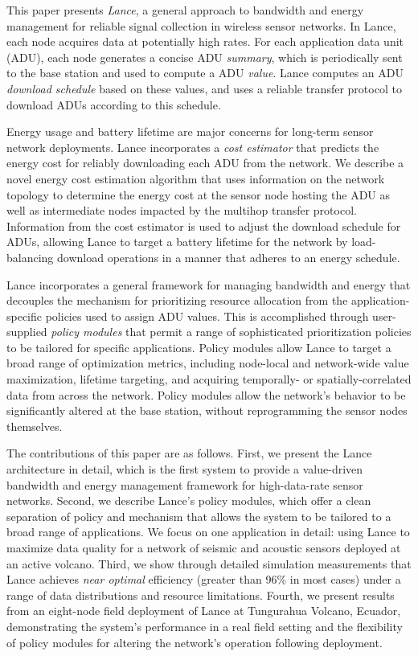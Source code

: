 \documentclass[lettersize]{sig-alternate-konrad}
\begin{document}
This paper presents {\em Lance}, a general approach to bandwidth and energy
management for reliable signal collection in wireless sensor networks. In
Lance, each node acquires data at potentially high rates. For each
application data unit (ADU), each node generates a concise ADU {\em summary},
which is periodically sent to the base station and used to compute a ADU {\em
value}.  Lance computes an ADU {\em download schedule} based on these values,
and uses a reliable transfer protocol to download ADUs according to this
schedule.

Energy usage and battery lifetime are major concerns for long-term
sensor network deployments. 
Lance incorporates a {\em cost estimator} that
predicts the energy cost for reliably
downloading each ADU from the network. We describe a novel energy cost
estimation algorithm that uses information on the network topology to 
determine the energy cost at the sensor node hosting the ADU as well
as intermediate nodes impacted by the multihop transfer protocol. 
Information from the cost estimator is used to adjust the download
schedule for ADUs, allowing Lance to target a battery lifetime for 
the network by load-balancing download operations in a manner that
adheres to an energy schedule.

Lance incorporates a general framework for managing bandwidth and
energy that decouples the mechanism for prioritizing resource allocation from
the application-specific policies used to assign ADU values.
This is accomplished through user-supplied {\em policy modules} that
permit a range of sophisticated prioritization policies to be
tailored for specific applications. Policy modules allow Lance to
target a broad range of optimization metrics, including node-local and
network-wide value maximization, lifetime targeting, 
and acquiring temporally-
or spatially-correlated data from across the network. 
Policy modules allow the network's behavior to be significantly altered
at the base station, without reprogramming the sensor nodes themselves.

The contributions of this paper are as follows. First, we present the
Lance architecture in detail, which is the first system to provide 
a value-driven bandwidth and energy management framework for 
high-data-rate sensor networks. Second, we describe Lance's policy 
modules, which offer a clean separation of policy and mechanism that 
allows the system to be tailored to a broad range of applications. 
We focus on one application in detail: using Lance to maximize data 
quality for a network of seismic and acoustic sensors deployed at 
an active volcano. Third, we show through detailed simulation 
measurements that Lance achieves {\em near optimal} efficiency 
(greater than 96\% in most cases) under a range of data distributions 
and resource limitations. 
Fourth, we present results from 
an eight-node field deployment of Lance at Tungurahua Volcano, 
Ecuador, demonstrating the system's performance in a real 
field setting and the flexibility of policy modules for 
altering the network's operation following deployment. 
\end{document}
